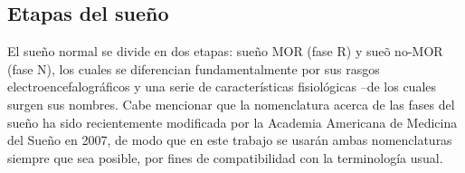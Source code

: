 
\subsection{Etapas del sue\~no}

El sue\~no normal se divide en dos etapas: sue\~no  MOR (fase R)
y sue\~o no-MOR (fase N), los cuales se diferencian 
fundamentalmente por sus rasgos electroencefalogr\'aficos y una serie de caracter\'isticas 
fisiol\'ogicas --de los cuales surgen sus nombres.
Cabe mencionar que
la nomenclatura acerca de las fases del sue\~no ha sido 
recientemente modificada por la Academia Americana de Medicina del Sueño en 2007, 
de modo que en este trabajo se usar\'an ambas nomenclaturas siempre que sea posible, por fines
de compatibilidad con la terminolog\'ia usual.




